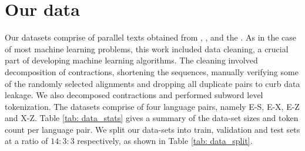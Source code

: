 \documentclass[11pt,a4paper]{article}
\begin{document}
\section{Our data}
Our datasets comprise of parallel texts obtained from \citet{orpus64352}, \citet{omniglot64352}, \citet{linguan_64352} and the \citet{wildcoast64352}. As in the case of most machine learning problems, this work included data cleaning, a crucial part of developing machine learning algorithms. The cleaning involved  decomposition of contractions, shortening the sequences, manually verifying some of the randomly selected alignments and dropping all duplicate pairs to curb data leakage. We also decomposed contractions and performed subword level tokenization. The datasets comprise of four language pairs, namely E-S, E-X, E-Z and X-Z. Table \ref{tab: data_stats} gives a summary of the data-set sizes and token count per language pair. We split our data-sets into train, validation and test sets at a ratio of $14:3:3$ respectively, as shown in Table \ref{tab: data_split}.
\end{document}
